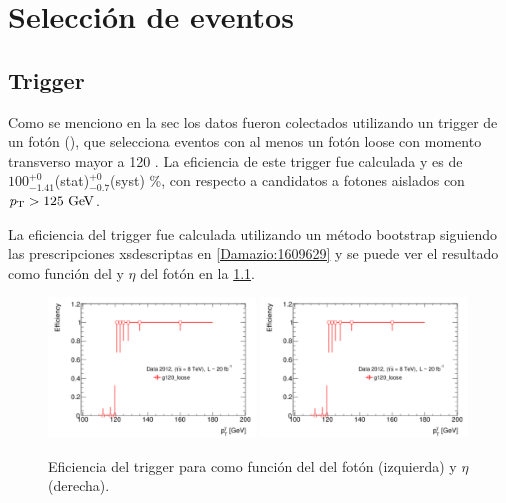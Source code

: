 \chapter{Selección de eventos}

\section{Trigger}\label{sec:trigger}

Como se menciono en la sec los datos fueron colectados utilizando un trigger
de un fotón (\trigchain), que selecciona eventos con al menos un fotón loose con
momento transverso mayor a 120 \gev.
La eficiencia de este trigger fue calculada y es de $100^{+0}_{-1.41}$(stat)${}^{+0}_{-0.7}$(syst) \%,
con respecto a candidatos a fotones aislados con $\pt>125 \gev$.

La eficiencia del trigger fue calculada utilizando un método bootstrap siguiendo las prescripciones
xsdescriptas en \cref{Damazio:1609629} y se puede ver el resultado como función del {\pt} y $\eta$ del
fotón en la \cref{fig:trigger_perf}.

\begin{figure}[h!]
  \centering
  \includegraphics[width=0.49\textwidth]{figures/EffPtg120_loose}
  \includegraphics[width=0.49\textwidth]{figures/EffPtg120_loose}
  \caption{Eficiencia del trigger para {\trigchain} como función del {\pt} del fotón (izquierda)
    y $\eta$ (derecha).}\label{fig:trigger_perf}
\end{figure}


